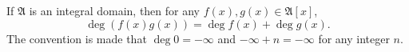 If $\mathfrak{A}$ is an integral domain, then for any $f(x), g(x) \in \mathfrak{A}[x]$,
$$\deg(f(x)g(x)) = \deg f(x) + \deg g(x).$$
The convention is made that $\deg 0 = -\infty$ and $-\infty + n = -\infty$ for any integer $n$.
